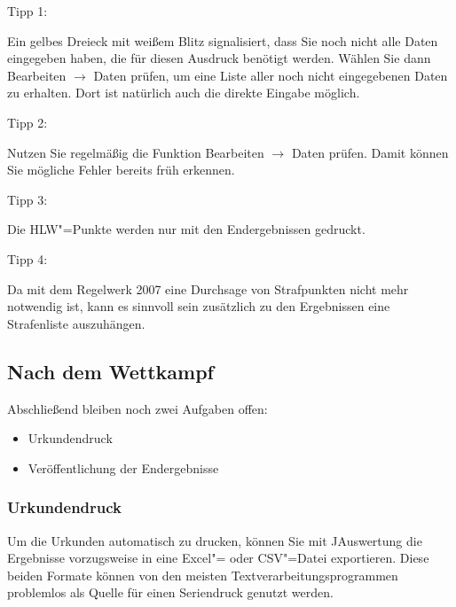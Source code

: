 \documentclass[11pt,a4paper,twoside,ngerman]{article}
\begin{document}
\begin{bfseries}Tipp 1:\end{bfseries} Ein gelbes Dreieck mit weißem Blitz signalisiert, dass Sie noch nicht alle Daten eingegeben haben, die für diesen Ausdruck benötigt werden. Wählen Sie dann \glqq{}Bearbeiten\grqq{} \ensuremath{\rightarrow} \glqq{}Daten prüfen\grqq{}, um eine Liste aller noch nicht eingegebenen Daten zu erhalten. Dort ist natürlich auch die direkte Eingabe möglich.

\begin{bfseries}Tipp 2:\end{bfseries} Nutzen Sie regelmäßig die Funktion \glqq{}Bearbeiten\grqq{} \ensuremath{\rightarrow} \glqq{}Daten prüfen\grqq{}. Damit können Sie mögliche Fehler bereits früh erkennen.

\begin{bfseries}Tipp 3:\end{bfseries} Die HLW"=Punkte werden nur mit den Endergebnissen gedruckt.

\begin{bfseries}Tipp 4:\end{bfseries} Da mit dem Regelwerk 2007 eine Durchsage von Strafpunkten nicht mehr notwendig ist, kann es sinnvoll sein zusätzlich zu den Ergebnissen eine Strafenliste auszuhängen.


\newpage

\subsection{Nach dem Wettkampf}
\label{lbl:nachdemwettkampf::begin}
Abschließend bleiben noch zwei Aufgaben offen:


\begin{itemize}

\item Urkundendruck


\item Veröffentlichung der Endergebnisse


\end{itemize}

\subsubsection*{Urkundendruck}
Um die Urkunden automatisch zu drucken, können Sie mit JAuswertung die Ergebnisse vorzugsweise in eine Excel"= oder CSV"=Datei exportieren. Diese beiden Formate können von den meisten Textverarbeitungsprogrammen problemlos als Quelle für einen Seriendruck genutzt werden.
\end{document}
